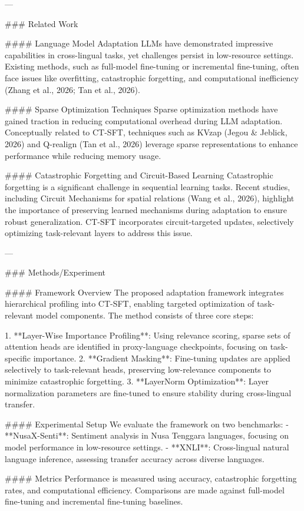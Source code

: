 ---

### Related Work

#### Language Model Adaptation
LLMs have demonstrated impressive capabilities in cross-lingual tasks, yet challenges persist in low-resource settings. Existing methods, such as full-model fine-tuning or incremental fine-tuning, often face issues like overfitting, catastrophic forgetting, and computational inefficiency (Zhang et al., 2026; Tan et al., 2026).

#### Sparse Optimization Techniques
Sparse optimization methods have gained traction in reducing computational overhead during LLM adaptation. Conceptually related to CT-SFT, techniques such as KVzap (Jegou & Jeblick, 2026) and Q-realign (Tan et al., 2026) leverage sparse representations to enhance performance while reducing memory usage.

#### Catastrophic Forgetting and Circuit-Based Learning
Catastrophic forgetting is a significant challenge in sequential learning tasks. Recent studies, including Circuit Mechanisms for spatial relations (Wang et al., 2026), highlight the importance of preserving learned mechanisms during adaptation to ensure robust generalization. CT-SFT incorporates circuit-targeted updates, selectively optimizing task-relevant layers to address this issue.

---

### Methods/Experiment

#### Framework Overview
The proposed adaptation framework integrates hierarchical profiling into CT-SFT, enabling targeted optimization of task-relevant model components. The method consists of three core steps:

1. **Layer-Wise Importance Profiling**: Using relevance scoring, sparse sets of attention heads are identified in proxy-language checkpoints, focusing on task-specific importance.
2. **Gradient Masking**: Fine-tuning updates are applied selectively to task-relevant heads, preserving low-relevance components to minimize catastrophic forgetting.
3. **LayerNorm Optimization**: Layer normalization parameters are fine-tuned to ensure stability during cross-lingual transfer.

#### Experimental Setup
We evaluate the framework on two benchmarks:
- **NusaX-Senti**: Sentiment analysis in Nusa Tenggara languages, focusing on model performance in low-resource settings.
- **XNLI**: Cross-lingual natural language inference, assessing transfer accuracy across diverse languages.

#### Metrics
Performance is measured using accuracy, catastrophic forgetting rates, and computational efficiency. Comparisons are made against full-model fine-tuning and incremental fine-tuning baselines.

